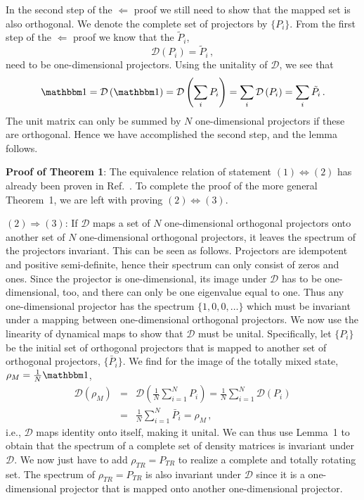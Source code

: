In the second step of the $\Longleftarrow$ proof we still need to show
that the mapped set is also orthogonal. We denote the
complete set of projectors by $\{P_{i}\}$. From the first step of the
$\Longleftarrow$ proof we know that the $\tilde{P}_{i}$,
\begin{equation*}
\mathcal{D}\left(P_{i}\right)=\tilde{P}_{i} \,,
\end{equation*}
need to be one-dimensional projectors.
Using the unitality of $\mathcal{D}$, we see that
\begin{equation*}
\openone=\mathcal{D}\left(\openone\right)=\mathcal{D}\left(\sum_{i}P_{i}\right)=
\sum_{i}\mathcal{D}\left(P_{i}\right)=\sum_{i}\tilde{P}_{i} \,.
\end{equation*}
The unit matrix can only be summed by $N$ one-dimensional projectors
if these are orthogonal. Hence we have accomplished the second step, and
the lemma follows.

\textbf{Proof of Theorem 1}:
The equivalence relation of statement $(1) \Longleftrightarrow (2)$ has already
been proven in Ref.~\cite{ReichKochPRA13}. To complete
the proof of the more general Theorem~1, we are left with proving
$(2) \Longleftrightarrow (3)$.

$\left(2\right)\Longrightarrow\left(3\right)$:
If $\mathcal D$ maps a set of $N$ one-dimensional orthogonal
projectors onto another set of $N$ one-dimensional orthogonal
projectors, it leaves the spectrum of the projectors invariant.
This can be seen as follows. Projectors are idempotent and positive
semi-definite, hence their spectrum can only consist of zeros and
ones. Since the projector is one-dimensional,
its image under $\mathcal{D}$ has to be one-dimensional, too, and
there can only be one eigenvalue equal to one. Thus any
one-dimensional projector has the spectrum $\{1,0,0,\dots\}$ which
must be invariant under a mapping between one-dimensional orthogonal
projectors.
We now use the linearity of dynamical maps to show
that $\mathcal D$ must be unital.
Specifically, let $\{P_i\}$ be the initial set of orthogonal projectors
that is mapped to another set of orthogonal projectors, $\{\bar{P}_i\}$.
We find for the image of the totally mixed state,
$\rho_M = \frac{1}{N} \openone$,
\begin{eqnarray*}
  \mathcal{D}(\rho_M) & = &
  \mathcal{D}\left(\frac{1}{N} \sum_{i=1}^N P_i\right) =
  \frac{1}{N} \sum_{i=1}^N \mathcal{D}(P_i) \\
  & = & \frac{1}{N} \sum_{i=1}^N \bar{P}_i = \rho_M \,,
\end{eqnarray*}
i.e., $\mathcal D$ maps identity onto itself, making it unital. We can
thus use Lemma~1 to obtain that the
spectrum of a complete set of density matrices is invariant under
$\mathcal D$.
We now just have to add $\rho_{TR}=P_{TR}$ to realize a complete and
totally rotating set. The spectrum of $\rho_{TR}=P_{TR}$ is also
invariant under $\mathcal D$ since it is a one-dimensional projector
that is mapped onto another one-dimensional projector.

